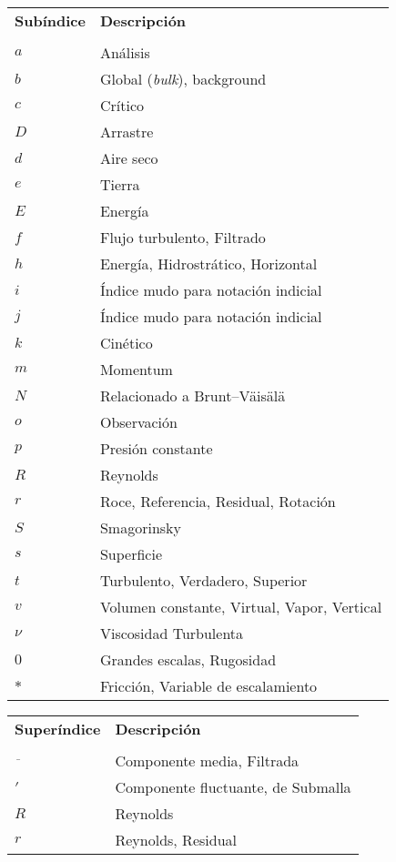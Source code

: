 \newpage
\begin{tabular}{ll}
	\textbf{Subíndice} & \textbf{Descripción}\\
	& \\
	$a$ & Análisis \\
	$b$ & Global (\emph{bulk}), background \\
	$c$ & Crítico \\
	$D$ & Arrastre \\
	$d$ & Aire seco \\
	$e$ & Tierra \\
	$E$ & Energía \\	
	$f$ & Flujo turbulento, Filtrado \\
	$h$ & Energía, Hidrostrático, Horizontal     \\
	$i$ & Índice mudo para notación indicial     \\
	$j$ & Índice mudo para notación indicial     \\
	$k$ & Cinético    \\
	$m$ & Momentum  	\\
	$N$ & Relacionado a Brunt–Väisälä \\
	$o$ & Observación \\
	$p$ & Presión constante \\
	$R$ & Reynolds \\	
	$r$ & Roce, Referencia, Residual, Rotación     \\
	$S$ & Smagorinsky \\
	$s$ & Superficie    \\
	$t$ & Turbulento, Verdadero, Superior \\
	$v$ & Volumen constante, Virtual, Vapor, Vertical \\
	$\nu$ & Viscosidad Turbulenta \\
	$0$ & Grandes escalas, Rugosidad\\
	$*$ & Fricción, Variable de escalamiento \\	
\end{tabular}

\bigskip
\begin{tabular}{ll}
	\textbf{Superíndice} & \textbf{Descripción}\\
	 & \\
	$\overline{\,\,\,}$ & Componente media, Filtrada      \\
	$'$ & Componente fluctuante, de Submalla  	\\
	$R$ & Reynolds \\
	$r$ & Reynolds, Residual \\
\end{tabular}